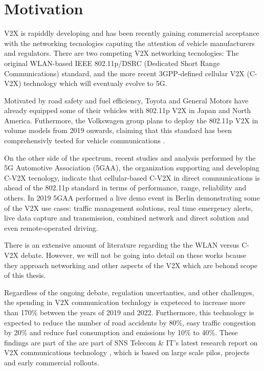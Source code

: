 \section{Motivation}
\label{section:motivation}
V2X is rapiddly developing and has been recently gaining commercial acceptance with the networking tecnologies caputing the attention of vehicle manufacturers and regulators. There are two competing V2X networking tecnologies: The original WLAN-based IEEE 802.11p/DSRC (Dedicated Short Range Communications) standard, and the more recent 3GPP-defined cellular V2X (C-V2X) technology which will eventualy evolve to 5G.

Motivated by road safety and fuel efficiency, Toyota and General Motors have already equipped some of their vehicles with 802.11p V2X in Japan and North America. Futhermore, the Volkswagen group plans to deploy the 802.11p V2X in volume models from 2019 onwards, claiming that this standard has been comprehensivly tested for vehicle communications \cite{Volkswagen}. 

On the other side of the spectrum, recent studies and analysis \cite{5gaa1} \cite{5gaa2} performed by the 5G Automotive Association (5GAA), the organization supporting and developing C-V2X tecnology, indicate that cellular-based C-V2X in direct communications is ahead of the 802.11p standard in terms of performance, range, reliability and others. In 2019 5GAA performed a live demo event in Berlin \cite{5gaa3} demonstrating some of the V2X use cases: traffic management solutions, real time emergency alerts, live data capture and transmission, combined network and direct solution and even remote-operated driving.

There is an extensive amount of literature regarding the the WLAN versus C-V2X debate. However, we will not be going into detail on these works bcause they approach networking and other aspects of the V2X which are behond scope of this thesis.

Regardless of the ongoing debate, regulation uncertanties, and other challenges, the spending in V2X communication technlogy is expeteced to increase more than 170\% between the years of 2019 and 2022. Furthermore, this technology is expected to reduce the number of road accidents by 80\%, easy traffic congestion by 20\% and reduce fuel consumption and emissions by 10\% to 40\%. These findings are part of the are part of SNS Telecom \& IT’s latest research report on V2X communications technology \cite{Report}, which is based on large scale pilos, projects and early commercial rollouts. 

